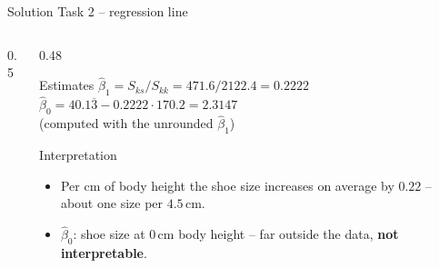 \documentclass[aspectratio=169,11pt]{beamer}
\newcommand{\heightpoints}{\addplot[only marks, mark=*, mark size=2.2pt, color=hsbiblau]
  coordinates {(164,39) (162,38) (168,39) (198,46) (166,40) (166,39) (192,45) (160,37) (151,36) (175,42) (180,43) (160,38) (168,41) (175,40) (168,39)};}
\begin{document}
\begin{frame}{Solution Task 2 -- regression line}
  \begin{columns}[T]
    \begin{column}{0.5\textwidth}
    \end{column}
    \begin{column}{0.48\textwidth}
      \small
      \begin{block}{Estimates}
        $\hat{\beta}_1 = S_{ks}/S_{kk}=471.6/2122.4 = \mathbf{0.2222}$\\[3pt]
        $\hat{\beta}_0 = 40.1\overline{3} - 0.2222 \cdot 170.2 = \mathbf{2.3147}$\\[2pt]
        \footnotesize (computed with the unrounded $\hat{\beta}_1$)
      \end{block}
      \begin{exampleblock}{Interpretation}
        \begin{itemize}
          \item Per cm of body height the shoe size increases on average by
                $0.22$ -- about one size per $4.5$\,cm.
          \item $\hat{\beta}_0$: shoe size at $0$\,cm body height -- far
                outside the data, \textbf{not interpretable}.
        \end{itemize}
      \end{exampleblock}
    \end{column}
  \end{columns}
\end{frame}
\end{document}
